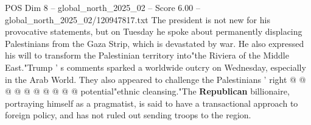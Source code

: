 \begin{textsample}{POS Dim 8 – global\_north\_2025\_02 – Score 6.00 – global\_north\_2025\_02/120947817.txt}
The president is not new for his provocative statements, but on Tuesday he spoke about permanently displacing Palestinians from the Gaza Strip, which is devastated by war.
He also expressed his will to transform the Palestinian territory into"the Riviera of the Middle East."Trump ' s comments sparked a worldwide outcry on Wednesday, especially in the Arab World.
They also appeared to challenge the Palestinians ' right @ @ @ @ @ @ @ @ @ @ potential"ethnic cleansing."The \textbf{Republican} billionaire, portraying himself as a pragmatist, is said to have a transactional approach to foreign policy, and has not ruled out sending troops to the region.

\end{textsample}

